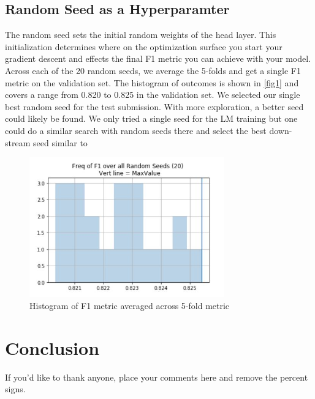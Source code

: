 \documentclass[smallcondensed]{svjour3}     %
\begin{document}
\subsection{Random Seed as a Hyperparamter}
\label{sec:rand_seeds}
The random seed sets the initial random weights of the head layer. This initialization determines where on the optimization surface you start your gradient descent and effects the final F1 metric you can achieve with your model.  
Across each of the 20 random seeds, we average the 5-folds and get a single F1 metric on the validation set.  The histogram of outcomes is shown in \ref{fig1} and covers a range  from 0.820 to 0.825 in the validation set. We selected our single best random seed for the test submission. With more exploration, a better seed could likely be found.  We only tried a single seed for the LM training but one could do a similar search with random seeds there and select the best down-stream seed similar to \cite{poleval}

\begin{figure}[h]
	\includegraphics[width=0.75\textwidth]{seed_hist_f1}
	\caption{Histogram of F1 metric averaged across 5-fold metric}
	\label{fig:random_seed_hist}
\end{figure}


\section{Conclusion}
\label{sec:5}


\begin{acknowledgements}
If you'd like to thank anyone, place your comments here
and remove the percent signs.
\end{acknowledgements}


%
%


\end{document}
